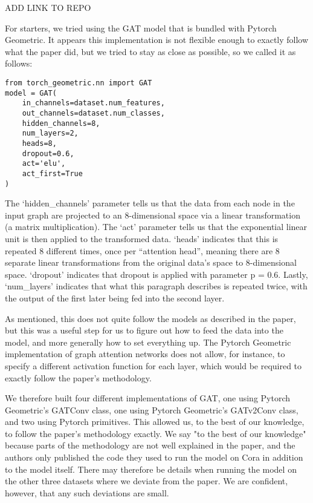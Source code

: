 ADD LINK TO REPO

For starters, we tried using the GAT model that is bundled with Pytorch
Geometric.  It appears this implementation is not flexible enough to exactly
follow what the paper did, but we tried to stay as close as possible, so we
called it as follows:

\begin{verbatim}
from torch_geometric.nn import GAT
model = GAT(
    in_channels=dataset.num_features,
    out_channels=dataset.num_classes,
    hidden_channels=8,
    num_layers=2,
    heads=8,
    dropout=0.6,
    act='elu',
    act_first=True
)
\end{verbatim}

The `hidden\_channels' parameter tells us that the data from each node in the
input graph are projected to an 8-dimensional space via a linear transformation
(a matrix multiplication).  The `act' parameter tells us that the exponential
linear unit is then applied to the transformed data.  `heads' indicates that
this is repeated 8 different times, once per ``attention head'', meaning there
are 8 separate linear transformations from the original data's space to
8-dimensional space.  `dropout' indicates that dropout is applied with
parameter p = 0.6. Lastly, `num\_layers' indicates that what this paragraph
describes is repeated twice, with the output of the first later being fed into
the second layer.

As mentioned, this does not quite follow the models as described in the paper,
but this was a useful step for us to figure out how to feed the data into the
model, and more generally how to set everything up. The Pytorch Geometric
implementation of graph attention networks does not allow, for instance, to
specify a different activation function for each layer, which would be required
to exactly follow the paper's methodology.

We therefore built four different implementations of GAT, one using Pytorch
Geometric's GATConv class, one using Pytorch Geometric's GATv2Conv class, and
two using Pytorch primitives. This allowed us, to the best of our knowledge, to
follow the paper's methodology exactly. We say "to the best of our knowledge"
because parts of the methodology are not well explained in the paper, and the
authors only published the code they used to run the model on Cora in addition
to the model itself. There may therefore be details when running the model on
the other three datasets where we deviate from the paper. We are confident,
however, that any such deviations are small.
